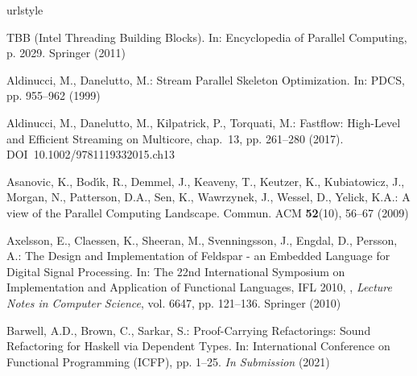 \documentclass[smallextended]{svjour3}
\begin{document}
%
%



%

\begin{thebibliography}{10}
\providecommand{\url}[1]{{#1}}
\providecommand{\urlprefix}{URL }
\expandafter\ifx\csname urlstyle\endcsname\relax
  \providecommand{\doi}[1]{DOI~\discretionary{}{}{}#1}\else
  \providecommand{\doi}{DOI~\discretionary{}{}{}\begingroup
  \urlstyle{rm}\Url}\fi

{TBB} (Intel Threading Building Blocks).
\newblock In: Encyclopedia of Parallel Computing, p. 2029. Springer (2011)

Aldinucci, M., Danelutto, M.: Stream Parallel Skeleton Optimization.
\newblock In: {PDCS}, pp. 955--962 (1999)

Aldinucci, M., Danelutto, M., Kilpatrick, P., Torquati, M.: Fastflow:
  High-Level and Efficient Streaming on Multicore, chap.~13, pp. 261--280
  (2017).
\newblock \doi{10.1002/9781119332015.ch13}

Asanovic, K., Bod{\'{\i}}k, R., Demmel, J., Keaveny, T., Keutzer, K.,
  Kubiatowicz, J., Morgan, N., Patterson, D.A., Sen, K., Wawrzynek, J., Wessel,
  D., Yelick, K.A.: A view of the Parallel Computing Landscape.
\newblock Commun. {ACM} \textbf{52}(10), 56--67 (2009)

Axelsson, E., Claessen, K., Sheeran, M., Svenningsson, J., Engdal, D., Persson,
  A.: The Design and Implementation of Feldspar - an Embedded Language for
  Digital Signal Processing.
\newblock In: {The 22nd International Symposium on Implementation and Application of Functional Languages, IFL 2010, }, \emph{Lecture Notes in Computer Science}, vol. 6647, pp.
  121--136. Springer (2010)

Barwell, A.D., Brown, C., Sarkar, S.: {Proof-Carrying Refactorings: Sound
  Refactoring for Haskell via Dependent Types}.
\newblock In: {International Conference on Functional Programming (ICFP)}, pp.
  1--25. \emph{In Submission} (2021)


\end{thebibliography}
\end{document}
